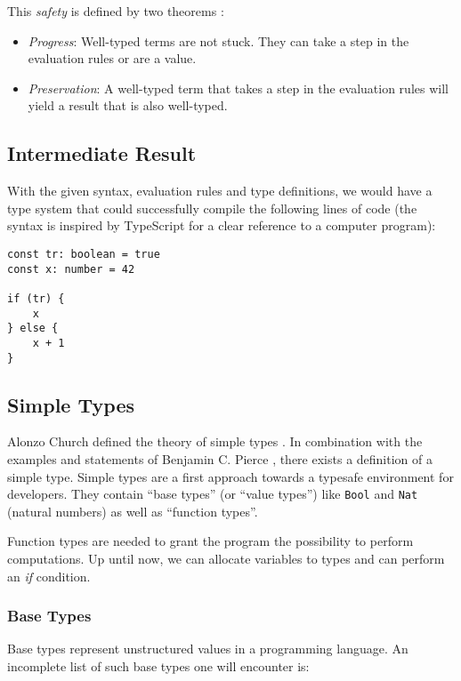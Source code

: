 This \textit{safety} is defined by two theorems \cite{pierce2002ProgLang}:
\begin{itemize}
    \item \textit{Progress}: Well-typed terms are not stuck. They can take
          a step in the evaluation rules or are a value.
    \item \textit{Preservation}: A well-typed term that takes a step in the evaluation rules
          will yield a result that is also well-typed.
\end{itemize}

\subsection{Intermediate Result}

With the given syntax, evaluation rules and type definitions, we would
have a type system that could successfully compile the following
lines of code (the syntax is inspired by TypeScript for a clear
reference to a computer program):

\begin{lstlisting}[style=JavaScript]
const tr: boolean = true
const x: number = 42

if (tr) {
    x
} else {
    x + 1
}
\end{lstlisting}

\subsection{Simple Types}

Alonzo Church defined the theory of simple types
\cite{churchLogic}. In combination with the examples and
statements of Benjamin C. Pierce \cite{pierce2002ProgLang}, there
exists a definition of a simple type. Simple types are a first
approach towards a typesafe environment for developers. They
contain ``base types'' (or ``value types'') like \texttt{Bool} and
\texttt{Nat} (natural numbers) as well as ``function types''.

Function types are needed to grant the program the possibility to
perform computations. Up until now, we can allocate variables to
types and can perform an \textit{if} condition.

\subsubsection{Base Types}

Base types represent unstructured values in a programming language.
An incomplete list of such base types one will encounter is:

